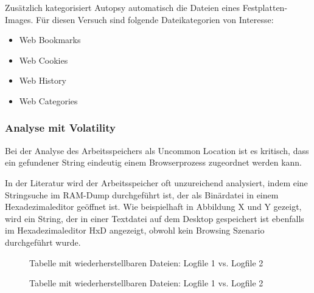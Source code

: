 Zusätzlich kategorisiert Autopsy automatisch die Dateien eines Festplatten-Images. Für diesen Versuch sind folgende Dateikategorien von Interesse:
\begin{itemize}
\item Web Bookmarks
\item Web Cookies
\item Web History
\item Web Categories
\end{itemize}


\subsubsection*{Analyse mit Volatility}
Bei der Analyse des Arbeitsspeichers als Uncommon Location ist es kritisch, dass ein gefundener String eindeutig einem Browserprozess zugeordnet werden kann. 

In der Literatur wird der Arbeitsspeicher oft unzureichend analysiert, indem eine Stringsuche im RAM-Dump durchgeführt ist, der als Binärdatei in einem Hexadezimaleditor geöffnet ist. \cite{Rochmadi.2017, Md.2018, Montasari.2015}
Wie beispielhaft in Abbildung X und Y gezeigt, wird ein String, der in einer Textdatei auf dem Desktop gespeichert ist ebenfalls im Hexadezimaleditor HxD angezeigt, obwohl kein Browsing Szenario durchgeführt wurde.
\begin{figure}[h!]
	\centerline{}
	\caption{Tabelle mit wiederherstellbaren Dateien: Logfile 1 vs. Logfile 2}
\end{figure}
\begin{figure}[h!]
	\caption{Tabelle mit wiederherstellbaren Dateien: Logfile 1 vs. Logfile 2}
\end{figure}

